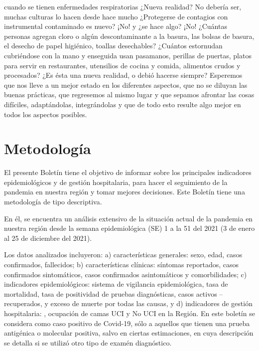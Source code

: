 \documentclass[12pt,a4paper,openany]{book}
\begin{document}
cuando se tienen enfermedades respiratorias ¿Nueva realidad? No debería ser, muchas culturas lo hacen desde hace mucho ¿Protegerse de contagios con instrumental contaminado es nuevo? ¡No! y ¿se hace algo? ¡No! ¿Cuántas personas agregan cloro o algún descontaminante a la basura, las bolsas de basura, el desecho de papel higiénico, toallas desechables? ¿Cuántos estornudan cubriéndose con la mano y enseguida usan pasamanos, perillas de puertas, platos para servir en restaurantes, utensilios de cocina y comida, alimentos crudos y procesados? ¿Es ésta una nueva realidad, o debió hacerse siempre? Esperemos que nos lleve a un mejor estado en los diferentes aspectos, que no se diluyan las buenas prácticas, que regresemos al mismo lugar y que sepamos afrontar las cosas difíciles, adaptándolas, integrándolas y que de todo esto resulte algo mejor en todos los aspectos posibles.


	
	
	
	\clearpage
	
	\section*{Metodología}	
	\noindent El presente Boletín tiene el objetivo de informar sobre los principales indicadores epidemiológicos y de gestión hospitalaria,  para hacer el seguimiento de la pandemia en nuestra región y tomar mejores decisiones. Este Boletín tiene una metodología de tipo descriptiva. 
	
	En él, se encuentra un análisis extensivo de la situación actual de la pandemia en nuestra región desde la semana epidemiológica (SE) 1 a la 51 del 2021 (3 de enero al 25 de diciembre del 2021).
	
	Los datos analizados incluyeron: a) características generales: sexo, edad, casos confirmados, fallecidos; b) características clínicas: síntomas reportados, casos confirmados sintomáticos, casos confirmados asintomáticos y comorbilidades; c) indicadores epidemiológicos: sistema de vigilancia epidemiológica, tasa de mortalidad, tasa de positividad de pruebas diagnósticas, casos activos – recuperados, y exceso de muerte por todas las causas, y d) indicadores de gestión hospitalaria: , ocupación de camas UCI y No UCI en la Región. En este boletín se considera como caso positivo de Covid-19, sólo a aquellos que tienen una prueba antigénica o molecular positiva, salvo en ciertas estimaciones, en cuya descripción se detalla si se utilizó otro tipo de examén diagnóstico. 
	
\end{document}

